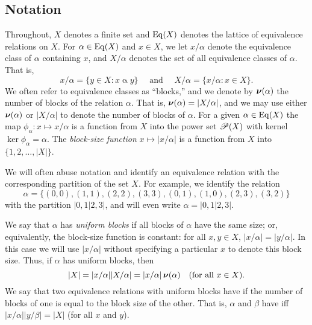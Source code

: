 \subsection{Notation}
Throughout, $X$ denotes a finite set and $\operatorname{Eq}(X)$ denotes the lattice of
equivalence relations on $X$. For $\alpha \in \operatorname{Eq}(X)$ and $x\in X$, we
let $x/\alpha$ denote the equivalence class of $\alpha$ containing $x$, and 
$X/\alpha$ denotes the set of all equivalence classes of $\alpha$. That is,
\[
x/\alpha = \{y\in X : x \mathrel{ \alpha } y\} \quad \text{ and } \quad
X/\alpha = \{x/\alpha : x\in X \}.
\]
We often refer to equivalence classes as
``blocks,'' and we denote by $\operatorname{\boldsymbol{\nu}}(\alpha)$ the number of blocks of the
relation $\alpha$. That is, $\operatorname{\boldsymbol{\nu}}(\alpha) = |X/\alpha|$, and we 
may use either $\operatorname{\boldsymbol{\nu}}(\alpha)$ or $|X/\alpha|$ to denote the number of 
blocks of $\alpha$.
For a given $\alpha\in \operatorname{Eq}(X)$ the map 
 $\phi_\alpha: x \mapsto x/\alpha$ is a
function from $X$ into the power set $\mathscr{P}(X)$
with kernel $\ker \phi_\alpha = \alpha$. 
The \emph{block-size function} $x \mapsto |x/\alpha|$ is a function from $X$ into $\{1,2,\dots, |X|\}$.

We will often abuse notation and identify an equivalence relation with the
corresponding partition of the set $X$.  For example, we identify
the relation 
\[
\alpha = \{(0,0), (1,1), (2,2), (3,3), (0,1), (1,0), (2,3), (3,2)\}
\]
with the partition $|0,1|2,3|$, and will even write $\alpha = |0,1|2,3|$. 

We say that $\alpha$ has \emph{uniform blocks} if all blocks of  $\alpha$ have
the same size; or, equivalently, the block-size function is constant: for all 
$x, y \in X$, $|x/\alpha| = |y/\alpha|$.  
In this case we will use $|x/\alpha|$ without specifying
a particular $x$ to denote this block size.
Thus, if $\alpha$
has uniform blocks, then
\[
|X|= |x/\alpha| |X/\alpha| = |x/\alpha| \operatorname{\boldsymbol{\nu}}(\alpha) \quad \text{(for all $x\in X$).}
\]
We say that two equivalence relations with uniform
blocks  have 
 if the number of blocks of one is equal to
the block size of the other. That is,
$\alpha$ and $\beta$ 
have \cubs
iff $|x/\alpha||y/\beta| = |X|$ (for all $x$ and $y$).


